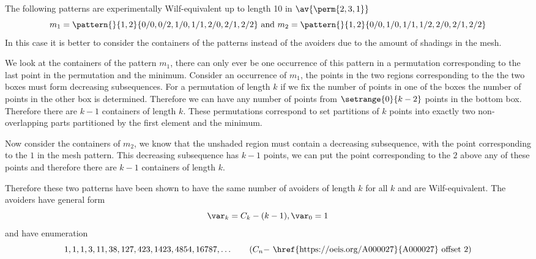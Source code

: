 \subsection{}
\nextvar
The following patterns are experimentally Wilf-equivalent up to length 10 in
\(\av{\perm{2,3,1}}\)
\begin{equation*}
    m_1 = \pattern{}{1,2}{0/0,0/2,
                    1/0,1/1,
                    2/0,2/1,2/2}
    \text{ and }
    m_2 = \pattern{}{1,2}{0/0,
                    1/0,1/1,1/2,
                    2/0,2/1,2/2}
\end{equation*}
In this case it is better to consider the containers of the patterns
instead of the avoiders due to the amount of shadings in the mesh.

We look at the containers of the pattern \(m_1\), there can only ever
be one occurrence of this pattern in a permutation corresponding to
the last point in the permutation and the minimum. Consider an occurrence of \(m_1\),
the points in the two regions corresponding to the the two boxes must form decreasing
subsequences.
For a permutation of length \(k\) if we fix the number of points in
one of the boxes the number of points in the other box is determined.
Therefore we can have any number of points from \(\setrange{0}{k-2}\)
points in the bottom box. Therefore there are \(k-1\) containers of
length \(k\). These permutations correspond to set partitions of \(k\)
points into exactly two non-overlapping parts partitioned by the first
element and the minimum.

Now consider the containers of \(m_2\), we know that the unshaded region
must contain a decreasing subsequence, with the point corresponding to
the \(1\) in the mesh pattern. This decreasing subsequence has \(k-1\)
points, we can put the point corresponding to the \(2\) above any of these
points and therefore there are \(k-1\) containers of length \(k\).

Therefore these two patterns have been shown to have the same number of
avoiders of length \(k\) for all \(k\) and are Wilf-equivalent.
The avoiders have general form
\begin{equation*}
  \var_k = C_k - (k-1), \var_0 = 1
\end{equation*}
and have enumeration
\begin{equation*}
    1, 1, 1, 3, 11, 38, 127, 423, 1423, 4854, 16787,\dotsc \tag{\(C_n -\) \href{https://oeis.org/A000027}{A000027} offset 2}
\end{equation*}

